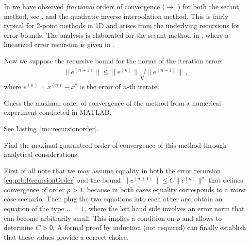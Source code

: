 \renewcommand{\chpt}{ch_iterativenonlinear}

\begin{problem} \label{prb:RecursionOrder}

In  we have observed \emph{fractional} orders of convergence ($\to$
) for both the secant method, see ,
and the quadratic inverse interpolation method. This is fairly typical for 2-point
methods in 1D and arises from the underlying recursions for error bounds. The
analysis is elaborated for the secant method in , where a
linearized error recursion is given in .

Now we suppose the recursive bound for the norms of the iteration errors
\begin{gather}    
  \label{eq:prb:RecursionOrder}
\|e^{(n+1)}\|\leq \|e^{(n)}\| \sqrt{\|e^{(n-1)}\|}\;,
\end{gather}
where $e^{(n)}=x^{(n)}-x^{*}$ is the error of $n$-th iterate. 

\begin{subproblem}[1]\label{prb:RecursionOrder_1}
Guess the maximal order of convergence of the method from a numerical experiment
conducted in MATLAB. \\
\hint {}

\begin{solution}
See Listing~\ref{mc:recursionorder}.

  \end{solution}
  \end{subproblem}

\begin{subproblem}[4]\label{prb:RecursionOrder_2}
Find the maximal
guaranteed order of convergence of this method through analytical considerations.

\begin{hint}
 First of all note that we may assume equality in both the error
recursion \eqref{eq:prb:RecursionOrder} and the bound $\|e^{(n+1)}\|\leq C\|e^{(n)}\|^{p}$ that
defines convergence of order $p>1$, because in both cases equality corresponds to a
worst case scenario. Then plug the two equations into each other and obtain
an equation of the type $\ldots = 1$, where the left hand side involves an 
error norm that can become arbitrarily small. This implies a condition on
$p$ and allows to determine $C>0$. A formal proof by induction (not required)
can finally establish that these values provide a correct choice. 
\end{hint}




\end{subproblem}
\end{problem}
